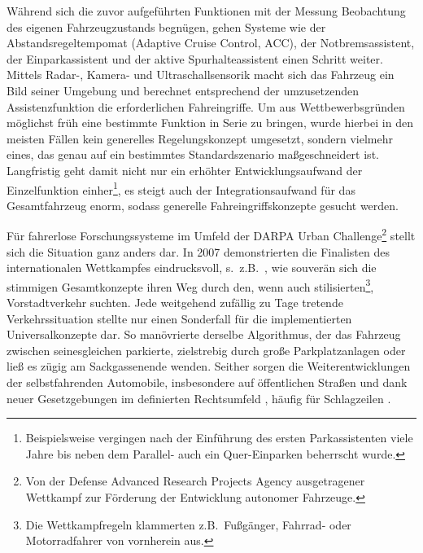 Während sich die zuvor aufgeführten Funktionen mit der Messung \bzw Beobachtung des eigenen Fahrzeugzustands begnügen, gehen Systeme wie der Abstandsregeltempomat (Adaptive Cruise Control, ACC), der Notbremsassistent, der Einparkassistent und der aktive Spurhalteassistent einen Schritt weiter. Mittels Radar-, Kamera- und Ultraschallsensorik macht sich das Fahrzeug ein Bild seiner Umgebung und berechnet entsprechend der umzusetzenden Assistenzfunktion die erforderlichen Fahreingriffe. Um aus Wettbewerbsgründen möglichst früh eine bestimmte Funktion in Serie zu bringen, wurde hierbei in den meisten Fällen kein generelles Regelungskonzept umgesetzt, sondern vielmehr eines, das genau auf ein bestimmtes Standardszenario maßgeschneidert ist. Langfristig geht damit nicht nur ein erhöhter Entwicklungsaufwand der Einzelfunktion einher\footnote{Beispielsweise vergingen nach der Einführung des ersten Parkassistenten viele Jahre bis neben dem Parallel- auch ein Quer-Einparken beherrscht wurde.}, es steigt auch der Integrationsaufwand für das Gesamtfahrzeug enorm, sodass generelle Fahreingriffskonzepte gesucht werden.

Für fahrerlose Forschungssysteme im Umfeld der DARPA Urban Challenge\footnote{Von der Defense Advanced Research Projects Agency ausgetragener Wettkampf zur Förderung der Entwicklung autonomer Fahrzeuge.} stellt sich die Situation ganz anders dar. In 2007 demonstrierten die Finalisten des internationalen Wettkampfes eindrucksvoll, s.\ z.B.\ \cite{urmson2008adu, montemerlo2008junior,bacha2008odin, jfr2008,rauskolb2008caroline,stiller2008probabilistische},  wie souverän sich die stimmigen Gesamtkonzepte ihren Weg durch den, wenn auch stilisierten\footnote{Die Wettkampfregeln klammerten z.B.\ Fußgänger, Fahrrad- oder Motorradfahrer von vornherein aus.}, Vorstadtverkehr suchten. Jede weitgehend zufällig zu Tage tretende Verkehrssituation stellte nur einen Sonderfall für die implementierten Universalkonzepte dar. So manövrierte derselbe Algorithmus, der das Fahrzeug zwischen seinesgleichen parkierte, zielstrebig durch große Parkplatzanlagen oder ließ es zügig am Sackgassenende wenden. Seither sorgen die Weiterentwicklungen der selbstfahrenden Automobile, insbesondere auf öffentlichen Straßen und dank neuer Gesetzgebungen im definierten Rechtsumfeld \cite{CNN2012_legal}, häufig für Schlagzeilen \cite{telegraph2012_google,daimler_faz_2013,Grundhoff2011}.

